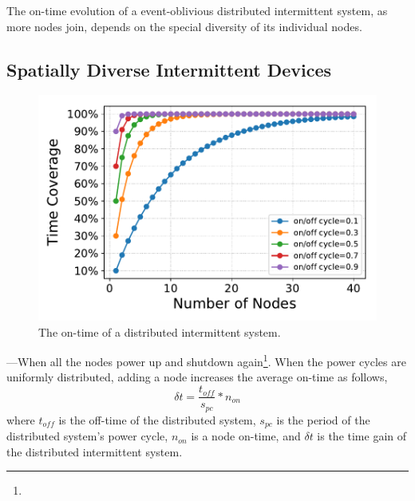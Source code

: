 
The on-time evolution of a event-oblivious distributed intermittent system, as more nodes join, depends on the special diversity of its individual nodes.
\subsection{Spatially Diverse Intermittent Devices}
%
\begin{figure}
	\centering
		\includegraphics[width=\columnwidth]{figures/coverage.pdf}
	\caption{The on-time of a distributed intermittent system.}
	\label{fig:independentCoverage}
\end{figure}
%
---When all the nodes power up and shutdown again\footnote{}. 
When the power cycles are uniformly distributed, adding a node increases the average on-time as follows, 
%
\begin{equation}
\delta t = \frac{t_{off}}{s_{pc}} * n_{on}
		\label{eq:indCov}
\end{equation}
%
where $t_{off}$ is the off-time of the distributed system, $s_{pc}$ is the period of the distributed system's power cycle, $n_{on}$ is a node on-time, and $\delta t$ is the time gain of the distributed intermittent system.

